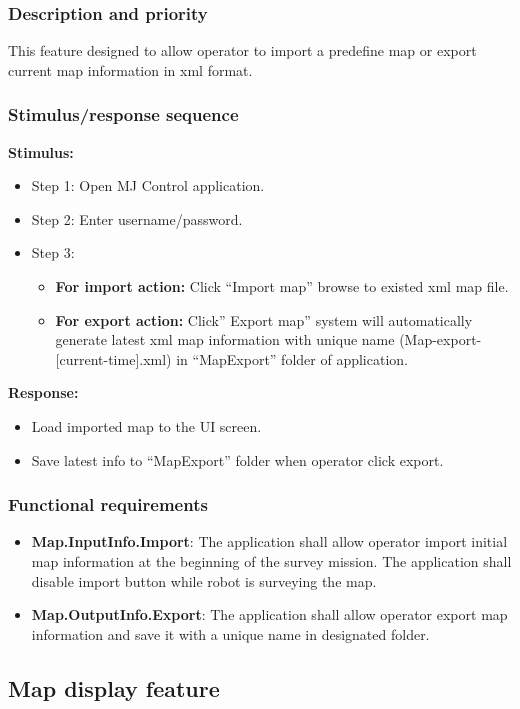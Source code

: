 \documentclass[10pt,a4paper,titlepage]{article}
\begin{document}
	\subsubsection{Description and priority}
	\text This feature designed to allow operator to import a predefine map or export current map information in xml format.
	\subsubsection{Stimulus/response sequence}
		\textbf{Stimulus:}
	\begin{itemize}
		\item Step 1: Open MJ Control application.
		\item Step 2: Enter username/password.
		\item {Step 3:}
		\begin{itemize}	
			\item \textbf{For import action:} Click “Import map” browse to existed xml map file.
			\item \textbf{For export action:} Click” Export map” system will automatically generate latest xml map information with unique name (Map-export-[current-time].xml) in “MapExport” folder of application.
		\end{itemize}
		
	\end{itemize}
	\textbf{Response:}
	\begin{itemize}
	\item Load imported map to the UI screen.
	\item Save latest info to “MapExport” folder when operator click export.
	\end{itemize}
	\subsubsection{Functional requirements}
	\begin{itemize}
		\item \textbf{Map.InputInfo.Import}: The application shall allow operator import initial map information at the beginning of the survey mission. The application shall disable import button while robot is surveying the map.
		\item \textbf{Map.OutputInfo.Export}: The application shall allow operator export map information and save it with a unique name in designated folder.
	\end{itemize}
	
	\subsection{Map display feature}
\end{document}
